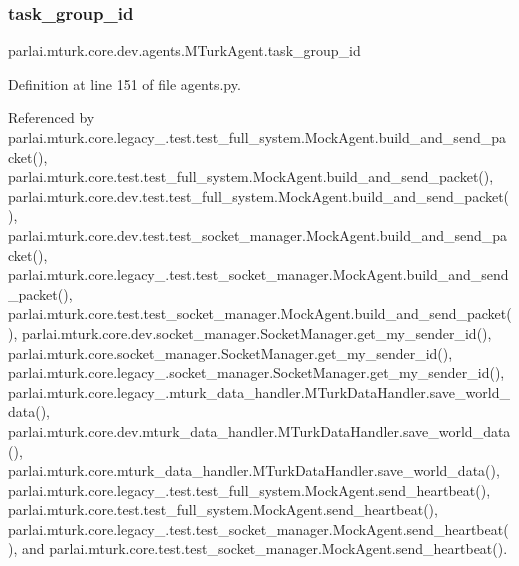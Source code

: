 \subsubsection{\texorpdfstring{task\+\_\+group\+\_\+id}{task\_group\_id}}
{\footnotesize\ttfamily parlai.\+mturk.\+core.\+dev.\+agents.\+M\+Turk\+Agent.\+task\+\_\+group\+\_\+id}



Definition at line 151 of file agents.\+py.



Referenced by parlai.\+mturk.\+core.\+legacy\+\_.\+test.\+test\+\_\+full\+\_\+system.\+Mock\+Agent.\+build\+\_\+and\+\_\+send\+\_\+packet(), parlai.\+mturk.\+core.\+test.\+test\+\_\+full\+\_\+system.\+Mock\+Agent.\+build\+\_\+and\+\_\+send\+\_\+packet(), parlai.\+mturk.\+core.\+dev.\+test.\+test\+\_\+full\+\_\+system.\+Mock\+Agent.\+build\+\_\+and\+\_\+send\+\_\+packet(), parlai.\+mturk.\+core.\+dev.\+test.\+test\+\_\+socket\+\_\+manager.\+Mock\+Agent.\+build\+\_\+and\+\_\+send\+\_\+packet(), parlai.\+mturk.\+core.\+legacy\+\_.\+test.\+test\+\_\+socket\+\_\+manager.\+Mock\+Agent.\+build\+\_\+and\+\_\+send\+\_\+packet(), parlai.\+mturk.\+core.\+test.\+test\+\_\+socket\+\_\+manager.\+Mock\+Agent.\+build\+\_\+and\+\_\+send\+\_\+packet(), parlai.\+mturk.\+core.\+dev.\+socket\+\_\+manager.\+Socket\+Manager.\+get\+\_\+my\+\_\+sender\+\_\+id(), parlai.\+mturk.\+core.\+socket\+\_\+manager.\+Socket\+Manager.\+get\+\_\+my\+\_\+sender\+\_\+id(), parlai.\+mturk.\+core.\+legacy\+\_.\+socket\+\_\+manager.\+Socket\+Manager.\+get\+\_\+my\+\_\+sender\+\_\+id(), parlai.\+mturk.\+core.\+legacy\+\_.\+mturk\+\_\+data\+\_\+handler.\+M\+Turk\+Data\+Handler.\+save\+\_\+world\+\_\+data(), parlai.\+mturk.\+core.\+dev.\+mturk\+\_\+data\+\_\+handler.\+M\+Turk\+Data\+Handler.\+save\+\_\+world\+\_\+data(), parlai.\+mturk.\+core.\+mturk\+\_\+data\+\_\+handler.\+M\+Turk\+Data\+Handler.\+save\+\_\+world\+\_\+data(), parlai.\+mturk.\+core.\+legacy\+\_.\+test.\+test\+\_\+full\+\_\+system.\+Mock\+Agent.\+send\+\_\+heartbeat(), parlai.\+mturk.\+core.\+test.\+test\+\_\+full\+\_\+system.\+Mock\+Agent.\+send\+\_\+heartbeat(), parlai.\+mturk.\+core.\+legacy\+\_.\+test.\+test\+\_\+socket\+\_\+manager.\+Mock\+Agent.\+send\+\_\+heartbeat(), and parlai.\+mturk.\+core.\+test.\+test\+\_\+socket\+\_\+manager.\+Mock\+Agent.\+send\+\_\+heartbeat().

\mbox{\label{classparlai_1_1mturk_1_1core_1_1dev_1_1agents_1_1MTurkAgent_a226a367f5473cbf5689ed91043ceb097}} 
